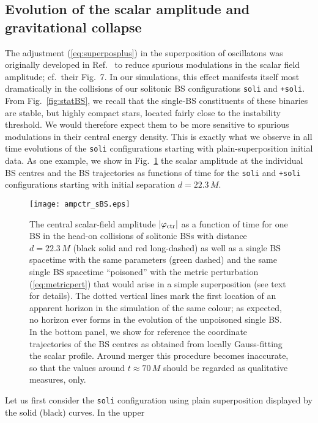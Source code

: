 \documentclass[]{iopart}
\begin{document}
\subsection{Evolution of the scalar amplitude and gravitational collapse}
%
The adjustment (\ref{eq:superposplus}) in the superposition of oscillatons
was originally developed in Ref.~\cite{Helfer:2018vtq} to reduce
spurious modulations in the scalar field amplitude; cf.~their
Fig.~7. In our simulations, this effect manifests itself
most dramatically in the collisions of our solitonic BS
configurations {\tt soli} and {\tt +soli}.
From Fig.~\ref{fig:statBS}, we recall that the single-BS constituents
of these binaries are stable, but highly compact stars, located
fairly close to the instability threshold. We would therefore expect
them to be more sensitive to spurious modulations in their central
energy density. This is exactly what we observe in all time evolutions
of the {\tt soli} configurations starting with plain-superposition
initial data. As one example, we show
in Fig.~\ref{fig:soli_ampctr} the scalar amplitude
at the individual BS centres and the BS trajectories
as functions of time for the
{\tt soli} and {\tt +soli} configurations starting with initial
separation $d=22.3\,M$.
%
\begin{figure}
    \centering
    \texttt{[image: ampctr\_sBS.eps]}
    \caption{The central scalar-field amplitude $|\varphi_{\rm ctr}|$ 
    as a function of time for one BS in the head-on
    collisions of solitonic BSs with distance $d=22.3\,M$
    (black solid and red long-dashed) as well as a single
    BS spacetime with the same parameters (green dashed)
    and the same single BS spacetime ``poisoned'' with
    the metric perturbation (\ref{eq:metricpert}) that would arise in a simple
    superposition (see text for details). The dotted
    vertical lines mark the first location of an
    apparent horizon in the simulation of the same colour;
    as expected, no horizon ever forms in the evolution
    of the unpoisoned single BS.
    In the bottom panel, we show for reference the coordinate
    trajectories of the BS centres as obtained from locally
    Gauss-fitting the scalar profile. Around merger this procedure
    becomes inaccurate, so that the values around $t\approx 70\,M$
    should be regarded as qualitative measures, only.
    }
    \label{fig:soli_ampctr}
\end{figure}
%
Let us first consider the {\tt soli} configuration using plain
superposition displayed by the solid (black) curves. In the upper
\end{document}
